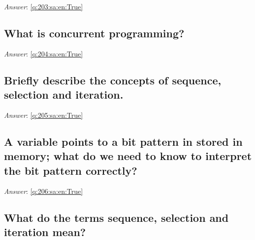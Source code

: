 \documentclass[a4paper,11pt,oneside]{article}
\begin{document}
\begin{sloppypar}
\textit{Answer}: \autoref{q:203:sa:en:True}



\subsection{What is concurrent programming?}

\label{q:204:sa:en:False}

\vspace{2cm}

\noindent\makebox[\textwidth]{\hrulefill}

\vspace{1cm}

\textit{Answer}: \autoref{q:204:sa:en:True}



\subsection{Briefly describe the concepts of sequence, selection and iteration.}

\label{q:205:sa:en:False}

\vspace{2cm}

\noindent\makebox[\textwidth]{\hrulefill}

\vspace{1cm}

\textit{Answer}: \autoref{q:205:sa:en:True}



\subsection{A variable points to a bit pattern in stored in memory; what do we need to know to interpret the bit pattern correctly?}

\label{q:206:sa:en:False}

\vspace{2cm}

\noindent\makebox[\textwidth]{\hrulefill}

\vspace{1cm}

\textit{Answer}: \autoref{q:206:sa:en:True}



\subsection{What do the terms sequence, selection and iteration mean?}


\end{sloppypar}
\end{document}
